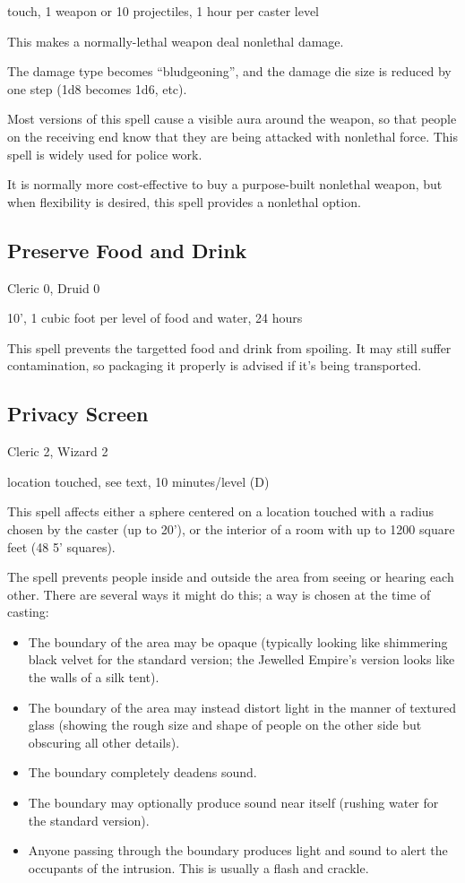 touch, 1 weapon or 10 projectiles, 1 hour per caster level

This makes a normally-lethal weapon deal nonlethal damage.

The damage type becomes ``bludgeoning'', and the damage die size is
reduced by one step (1d8 becomes 1d6, etc).

Most versions of this spell cause a visible aura around the weapon, so
that people on the receiving end know that they are being attacked with
nonlethal force. This spell is widely used for police work.

It is normally more cost-effective to buy a purpose-built nonlethal weapon,
but when flexibility is desired, this spell provides a nonlethal option.
%

%
\subsection{Preserve Food and Drink}

Cleric 0, Druid 0

10', 1 cubic foot per level of food and water, 24 hours

This spell prevents the targetted food and drink from spoiling. It may still
suffer contamination, so packaging it properly is advised if it's being
transported.
%

%
\subsection{Privacy Screen}

Cleric 2, Wizard 2

location touched, see text, 10 minutes/level (D)

This spell affects either a sphere centered on a location touched with a
radius chosen by the caster (up to 20'), or the interior of a room with up
to 1200 square feet (48 5' squares).

The spell prevents people inside and outside the area from seeing or hearing
each other. There are several ways it might do this; a way is chosen at the
time of casting:
\begin{itemize}
\item The boundary of the area may be opaque (typically looking like
shimmering black velvet for the standard version; the Jewelled Empire's
version looks like the walls of a silk tent).
\item The boundary of the area may instead distort light in the manner of
textured glass (showing the rough size and shape of people on the other
side but obscuring all other details).
\item The boundary completely deadens sound.
\item The boundary may optionally produce sound near itself (rushing water
for the standard version).
\item Anyone passing through the boundary produces light and sound to alert
the occupants of the intrusion. This is usually a flash and crackle.
\end{itemize}

